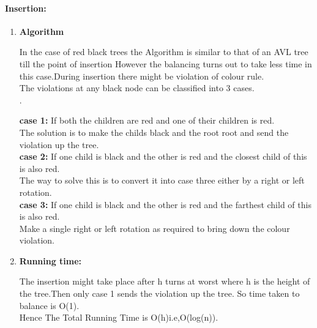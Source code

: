 \documentclass[a4paper,11pt]{article}
\begin{document}
\paragraph{Insertion:}
\begin{enumerate}
 \item \textbf{Algorithm}
 
 
 
In the case of red black trees the Algorithm is similar to that of an AVL tree till the point of insertion However the balancing turns out to take less time in this case.During insertion there might be violation of colour rule.\\
The violations at any black node can be classified into 3 cases.\\ .


\textbf{case 1:} If both the children are red and one of their children is red.\\
The solution is to make the childs black and the root root and send the violation up the tree.\\
\textbf{case 2:} If one child is black and the other is red and the closest child of this is also red.\\
The way to solve this is to convert it into case three either by a right or left rotation.\\
\textbf{case 3:} If one child is black and the other is red and the farthest child of this is also red.\\
Make a single right or left rotation as required to bring down the colour violation.\\


 \item \textbf{Running time:}
 
 
 The insertion might take place after h turns at worst where h is the height of the tree.Then only case 1 sends the violation  up the tree. So time taken to balance is O(1).\\
 Hence The Total Running Time is O(h)i.e,O(log(n)).\\

\end{enumerate}
\end{document}
